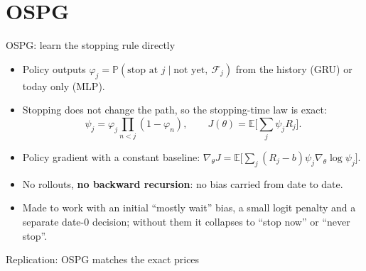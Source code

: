 \section{OSPG}

\begin{frame}{OSPG: learn the stopping rule directly}
\begin{itemize}
\item Policy outputs $\varphi_j=\mathbb P(\text{stop at }j\mid\text{not yet},\ \mathcal F_j)$
  from the history (GRU) or today only (MLP).
\item Stopping does not change the path, so the stopping-time law is exact:
  \[\psi_j=\varphi_j\prod_{n<j}(1-\varphi_n),\qquad J(\theta)=\mathbb E\Big[\sum_j\psi_jR_j\Big].\]
\item Policy gradient with a constant baseline:
  $\nabla_\theta J=\mathbb E\big[\sum_j(R_j-b)\psi_j\nabla_\theta\log\psi_j\big]$.
\item No rollouts, \textbf{no backward recursion}: no bias carried from date to date.
\item Made to work with an initial ``mostly wait'' bias, a small logit penalty and a separate
  date-0 decision; without them it collapses to ``stop now'' or ``never stop''.
\end{itemize}
\end{frame}

\begin{frame}{Replication: OSPG matches the exact prices}
\centering\scriptsize


\vspace{6pt}\normalsize

\end{frame}
